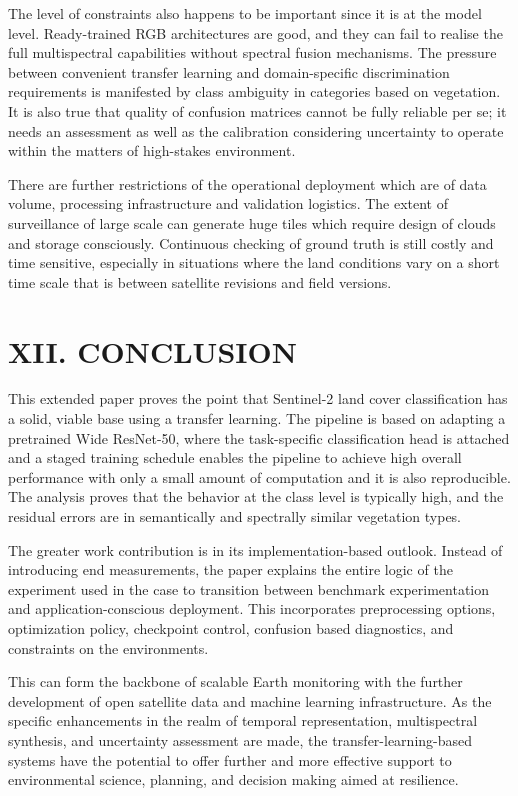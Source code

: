﻿\documentclass[conference]{IEEEtran}
\begin{document}
The level of constraints also happens to be important since it is at the model level. Ready-trained RGB architectures are good, and they can fail to realise the full multispectral capabilities without spectral fusion mechanisms. The pressure between convenient transfer learning and domain-specific discrimination requirements is manifested by class ambiguity in categories based on vegetation. It is also true that quality of confusion matrices cannot be fully reliable per se; it needs an assessment as well as the calibration considering uncertainty to operate within the matters of high-stakes environment.

There are further restrictions of the operational deployment which are of data volume, processing infrastructure and validation logistics. The extent of surveillance of large scale can generate huge tiles which require design of clouds and storage consciously. Continuous checking of ground truth is still costly and time sensitive, especially in situations where the land conditions vary on a short time scale that is between satellite revisions and field versions.

\section*{XII. CONCLUSION}

This extended paper proves the point that Sentinel-2 land cover classification has a solid, viable base using a transfer learning. The pipeline is based on adapting a pretrained Wide ResNet-50, where the task-specific classification head is attached and a staged training schedule enables the pipeline to achieve high overall performance with only a small amount of computation and it is also reproducible. The analysis proves that the behavior at the class level is typically high, and the residual errors are in semantically and spectrally similar vegetation types.

The greater work contribution is in its implementation-based outlook. Instead of introducing end measurements, the paper explains the entire logic of the experiment used in the case to transition between benchmark experimentation and application-conscious deployment. This incorporates preprocessing options, optimization policy, checkpoint control, confusion based diagnostics, and constraints on the environments.

This can form the backbone of scalable Earth monitoring with the further development of open satellite data and machine learning infrastructure. As the specific enhancements in the realm of temporal representation, multispectral synthesis, and uncertainty assessment are made, the transfer-learning-based systems have the potential to offer further and more effective support to environmental science, planning, and decision making aimed at resilience.
\end{document}
